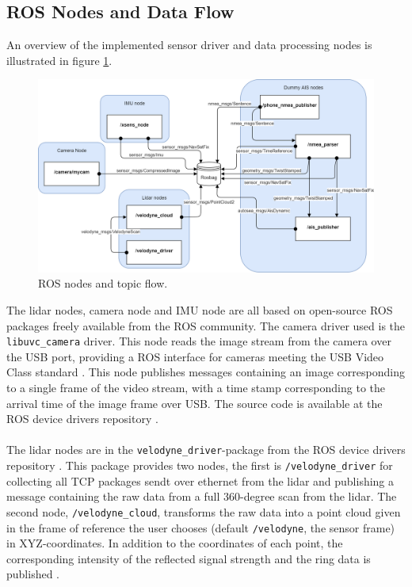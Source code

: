 \subsection{ROS Nodes and Data Flow}
An overview of the implemented sensor driver and data processing nodes is illustrated in figure \ref{fig:ros_nodes}.
\begin{figure}[H]
    \centering
    \includegraphics[width=.8\linewidth]{fig/ros.png}
    \caption{ROS nodes and topic flow.}
    \label{fig:ros_nodes}
\end{figure}
The lidar nodes, camera node and IMU node are all based on open-source ROS packages freely available from the ROS community. The camera driver used is the \\\lstinline[basicstyle=\ttfamily]{libuvc_camera} driver. This node reads the image stream from the camera over the USB port, providing a ROS interface for cameras meeting the USB Video Class standard \cite{libuvc_camera}. This node publishes messages containing an image corresponding to a single frame of the video stream, with a time stamp corresponding to the arrival time of the image frame over USB. The source code is available at the ROS device drivers repository \cite{ros_drivers}.\\
\vspace{2mm}\\
\noindent The lidar nodes are in the \lstinline[basicstyle=\ttfamily]{velodyne_driver}-package from the ROS device drivers repository \cite{ros_drivers}. This package provides two nodes, the first is \lstinline[basicstyle=\ttfamily]{/velodyne_driver} for collecting all TCP packages sendt over ethernet from the lidar and publishing a message containing the raw data from a full 360-degree scan from the lidar. The second node, \lstinline[basicstyle=\ttfamily]{/velodyne_cloud}, transforms the raw data into a point cloud given in the frame of reference the user chooses (default \lstinline[basicstyle=\ttfamily]{/velodyne}, the sensor frame) in XYZ-coordinates. In addition to the coordinates of each point, the corresponding intensity of the reflected signal strength and the ring data is published \cite{velodyne_driver}.\\ 
